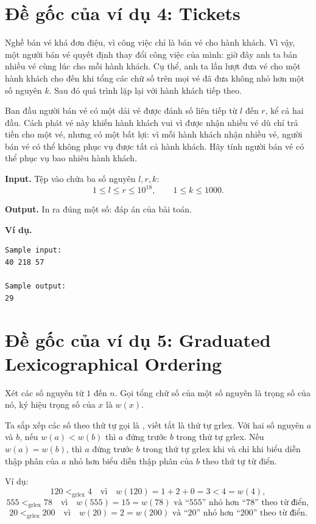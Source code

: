\documentclass[11pt]{article}
\newcommand{\grlex}{\mathrel{<_{\mathrm{grlex}}}}
\begin{document}
\section{Đề gốc của ví dụ 4: Tickets}

Nghề bán vé khá đơn điệu, vì công việc chỉ là bán vé cho hành khách. Vì vậy,
một người bán vé quyết định thay đổi công việc của mình: giờ đây anh ta bán
nhiều vé cùng lúc cho mỗi hành khách. Cụ thể, anh ta lần lượt đưa vé cho một
hành khách cho đến khi tổng các chữ số trên mọi vé đã đưa không nhỏ hơn một số
nguyên $k$. Sau đó quá trình lặp lại với hành khách tiếp theo.

Ban đầu người bán vé có một dải vé được đánh số liên tiếp từ $l$ đến $r$, kể
cả hai đầu. Cách phát vé này khiến hành khách vui vì được nhận nhiều vé dù chỉ
trả tiền cho một vé, nhưng có một bất lợi: vì mỗi hành khách nhận nhiều vé,
người bán vé có thể không phục vụ được tất cả hành khách. Hãy tính người bán
vé có thể phục vụ bao nhiêu hành khách.

\textbf{Input.} Tệp vào chứa ba số nguyên $l,r,k$:
\[
  1\le l\le r\le 10^{18},\qquad 1\le k\le 1000.
\]

\textbf{Output.} In ra đúng một số: đáp án của bài toán.

\textbf{Ví dụ.}
\begin{verbatim}
Sample input:
40 218 57

Sample output:
29
\end{verbatim}

\section{Đề gốc của ví dụ 5: Graduated Lexicographical Ordering}

Xét các số nguyên từ $1$ đến $n$. Gọi tổng chữ số của một số nguyên là trọng
số của nó, ký hiệu trọng số của $x$ là $w(x)$.

Ta sắp xếp các số theo thứ tự gọi là ,
viết tắt là thứ tự grlex. Với hai số nguyên $a$ và $b$, nếu $w(a)<w(b)$ thì
$a$ đứng trước $b$ trong thứ tự grlex. Nếu $w(a)=w(b)$, thì $a$ đứng trước $b$
trong thứ tự grlex khi và chỉ khi biểu diễn thập phân của $a$ nhỏ hơn biểu
diễn thập phân của $b$ theo thứ tự từ điển.

Ví dụ:
\[
  120\grlex 4
  \quad\text{vì}\quad
  w(120)=1+2+0=3<4=w(4),
\]
\[
  555\grlex 78
  \quad\text{vì}\quad
  w(555)=15=w(78)
  \text{ và ``555'' nhỏ hơn ``78'' theo từ điển},
\]
\[
  20\grlex 200
  \quad\text{vì}\quad
  w(20)=2=w(200)
  \text{ và ``20'' nhỏ hơn ``200'' theo từ điển}.
\]
\end{document}
